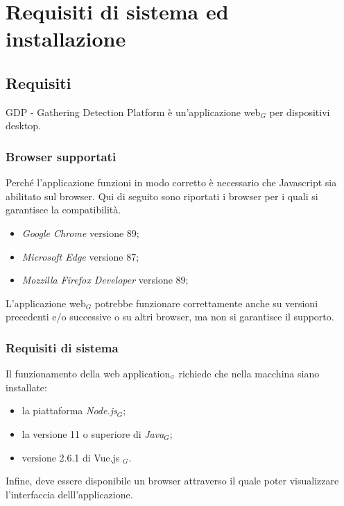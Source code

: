 \chapter{Requisiti di sistema ed installazione}\label{RequisitiDiSistemaEdInstallazione}

\section{Requisiti}\label{RequisitiDiSistemaEdInstallazioneRequisiti}
GDP - Gathering Detection Platform è un'applicazione web$_G$ per dispositivi desktop. 

\subsection{Browser supportati}\label{RequisitiDiSistemaEdInstallazioneRequisitiBrowserSupportati}
Perché l'applicazione funzioni in modo corretto è necessario che Javascript sia abilitato sul browser. 
Qui di seguito sono riportati i browser per i quali si garantisce la compatibilità. 
\begin{itemize}
	\item \textit{Google Chrome} versione 89;
	\item \textit{Microsoft Edge} versione 87;
	\item \textit{Mozzilla Firefox Developer} versione 89;
\end{itemize}
L'applicazione web$_G$ potrebbe funzionare correttamente anche su versioni precedenti e/o successive o su altri browser, ma non si garantisce il supporto. 
 
\subsection{Requisiti di sistema}\label{RequisitiDiSistemaEdInstallazioneRequisitiRequisitiDiSistema}

Il funzionamento della web application$_{\scaleto{G}{3pt}}$ richiede che nella macchina siano installate:
\begin{itemize}
	\item la piattaforma \textit{Node.js}$_G$;
	\item la versione 11 o superiore di \textit{Java}$_G$;
	\item versione 2.6.1 di Vue.js $_G$.
\end{itemize}
Infine, deve essere disponibile un browser attraverso il quale poter visualizzare l'interfaccia delll'applicazione.

